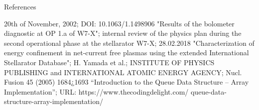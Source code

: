 \documentclass[final]{beamer}
\begin{document}
\begin{frame}
\begin{minipage}[t]{0.30\textwidth}
\begin{kasten}{\large%
                References}
{\begin{thebibliography}{}
                        20th of November, 2002; DOI: 10.1063/1.1498906%
                        "Results of the bolometer diagnostic at %
                        OP 1.a of W7-X"; internal review of the %
                        physics plan during the %
                        second operational phase at the stellarator %
                        W7-X; 28.02.2018%
                        "Characterization of energy confinement in %
                        net-current free plasmas using the %
                        extended International Stellarator Database"; %
                        H. Yamada et al.; %
                        INSTITUTE OF PHYSICS PUBLISHING and %
                        INTERNATIONAL ATOMIC ENERGY AGENCY; %
                        Nucl. Fusion 45 (2005) 1684¿1693%
                        ``Introduction to the Queue Data Structure – Array %
                        Implementation''; %
                        URL: https://www.thecodingdelight.com/%
                        queue-data-structure-array-implementation/
                \end{thebibliography}}%
            \end{kasten}
            \vspace*{0.5cm}%
            \begin{columns}%
\end{columns}
\end{minipage}
\end{frame}
\end{document}
